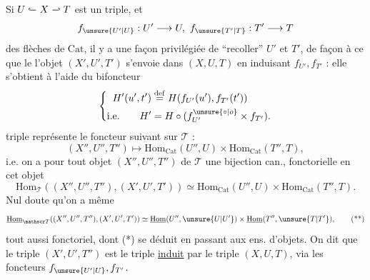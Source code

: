 Si $U\mathrel{\lhook\joinrel\relbar}X\mathrel{\relbar\joinrel\rhook}T$ est un triple,  et
\[
f_{\unsure{U'|U}}:U'\longrightarrow U,\ f_{\unsure{T'|T}}:T'\longrightarrow T
\]
des flèches de $\mathrm{Cat}$, il y a une façon privilégiée de ``recoller'' $U'$ et $T'$, de façon à ce que le l'objet $(X',U',T')$ s'envoie dans $(X,U,T)$  en induisant
$f_{U'},f_{T'}$ :
elle s'obtient à l'aide du bifoncteur
\[
\left\{\begin{aligned} H'(u',t')&\overset{\mathrm{def}}{=}H(f_{U'}(u'),f_{T'}(t'))\\ \text{i.e.}\qquad H'&= H\circ(f_{U'}^{\unsure{\circ|o}}\times f_{T'}).\end{aligned}\right.
\]
 triple  représente le foncteur suivant sur $\mathscr T$ :
\[
(X'',U'',T'')\longmapsto\mathrm{Hom}_{\mathrm{Cat}}(U'',U)\times\mathrm{Hom}_{\mathrm{Cat}}(T'',T),
\]
i.e. on a pour tout objet $(X'',U'',T'')$ de $\mathscr T$ une bijection can., fonctorielle en cet objet
\[
\mathrm{Hom}_{\mathscr T}((X'',U'',T''),(X',U',T'))\simeq\mathrm{Hom}_{\mathrm{Cat}}(U'',U)\times\mathrm{Hom}_{\mathrm{Cat}}(T'',T).\tag*{(*)}
\]
Nul doute qu'on a même
\[
\underline{\mathrm{Hom}}_{\mathscr T}((X'',U'',T''),(X',U',T'))\simeq\underline{\mathrm{Hom}}(U'',\unsure{U|U'})\times\underline{\mathrm{Hom}}(T'',\unsure{T|T'}),\tag*{(**)}
\]
tout aussi fonctoriel, dont (*) se déduit en passant aux ens. d'objets. On dit que le triple $(X',U',T'')$  est  le triple \uline{induit} par le triple $(X,U,T)$, via les foncteurs $f_{\unsure{U'|U}},f_{T'}$.

